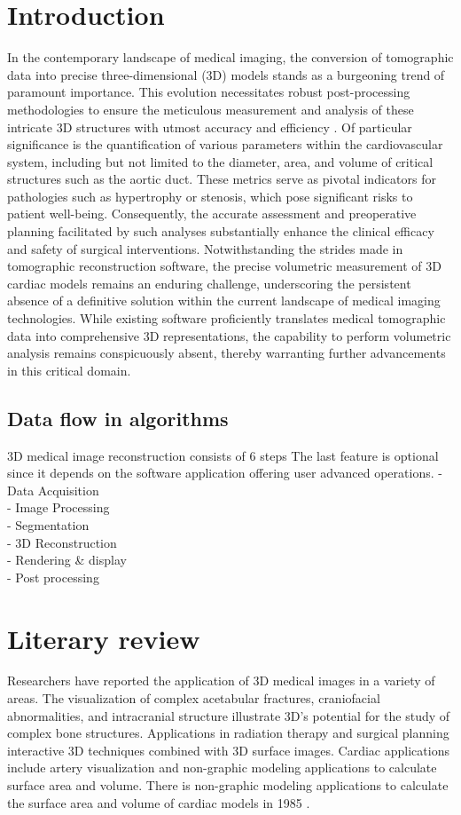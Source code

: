 \documentclass[11pt]{article}
\begin{document}
\begin{multicols}{2} 
\section{Introduction}
In the contemporary landscape of medical imaging, the conversion of tomographic data into precise three-dimensional (3D) models stands as a burgeoning trend of paramount importance. This evolution necessitates robust post-processing methodologies to ensure the meticulous measurement and analysis of these intricate 3D structures with utmost accuracy and efficiency \cite{intrinsic}. Of particular significance is the quantification of various parameters within the cardiovascular system, including but not limited to the diameter, area, and volume of critical structures such as the aortic duct. These metrics serve as pivotal indicators for pathologies such as hypertrophy or stenosis, which pose significant risks to patient well-being. Consequently, the accurate assessment and preoperative planning facilitated by such analyses substantially enhance the clinical efficacy and safety of surgical interventions. Notwithstanding the strides made in tomographic reconstruction software, the precise volumetric measurement of 3D cardiac models remains an enduring challenge, underscoring the persistent absence of a definitive solution within the current landscape of medical imaging technologies. While existing software proficiently translates medical tomographic data into comprehensive 3D representations, the capability to perform volumetric analysis remains conspicuously absent, thereby warranting further advancements in this critical domain.

\subsection{Data flow in algorithms}
3D medical image reconstruction consists of 6 steps The last feature is optional since it depends on the software application offering user advanced operations. 
- Data Acquisition \\ 
- Image Processing \\
- Segmentation \\ 
- 3D Reconstruction \\ 
- Rendering \& display \\
- Post processing 

\section{Literary review}
Researchers have reported the application of 3D medical images in a variety of areas. The visualization of complex acetabular fractures, craniofacial abnormalities, and intracranial structure illustrate 3D's potential for the study of complex bone structures. Applications in radiation therapy and surgical planning interactive 3D techniques combined with 3D surface images. Cardiac applications include artery visualization and non-graphic modeling applications to calculate surface area and volume. There is non-graphic modeling applications to calculate the surface area and volume of cardiac models in 1985 \cite{hoffman}.


\end{multicols}
\end{document}
